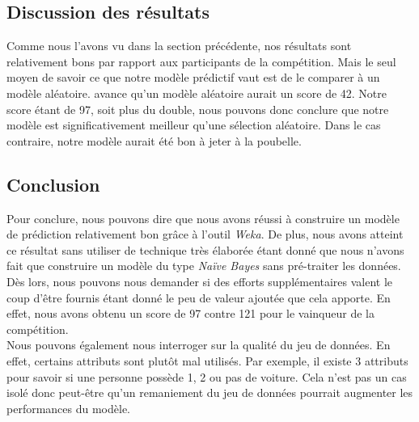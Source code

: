 \documentclass[11pt,a4paper]{article}
\begin{document}
			\subsection{Discussion des résultats}
			
				Comme nous l'avons vu dans la section précédente, nos résultats sont relativement bons par rapport aux participants de la compétition. Mais le seul moyen de savoir ce que notre modèle prédictif vaut est de le comparer à un modèle aléatoire. \cite[Putten]{CoIlChallenge} avance qu'un modèle aléatoire aurait un score de 42. Notre score étant de 97, soit plus du double, nous pouvons donc conclure que notre modèle est significativement meilleur qu'une sélection aléatoire. Dans le cas contraire, notre modèle aurait été bon à jeter à la poubelle.\\
				
			\subsection{Conclusion}
			
				Pour conclure, nous pouvons dire que nous avons réussi à construire un modèle de prédiction relativement bon grâce à l'outil \textit{Weka}. De plus, nous avons atteint ce résultat sans utiliser de technique très élaborée étant donné que nous n'avons fait que construire un modèle du type \textit{Naïve Bayes} sans pré-traiter les données. Dès lors, nous pouvons nous demander si des efforts supplémentaires valent le coup d'être fournis étant donné le peu de valeur ajoutée que cela apporte. En effet, nous avons obtenu un score de 97 contre 121 pour le vainqueur de la compétition.\\
				
				Nous pouvons également nous interroger sur la qualité du jeu de données. En effet, certains attributs sont plutôt mal utilisés. Par exemple, il existe 3 attributs pour savoir si une personne possède 1, 2 ou pas de voiture. Cela n'est pas un cas isolé donc peut-être qu'un remaniement du jeu de données pourrait augmenter les performances du modèle.   
				
			
	
	
          	
\end{document}
